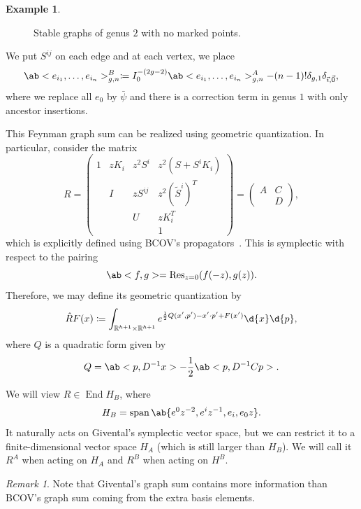 \documentclass[10pt]{amsart}
\theoremstyle{definition}
\newtheorem{exm}[thm]{Example}
\theoremstyle{remark}
\newtheorem{rmk}[thm]{Remark}
\theoremstyle{plain}
\theoremstyle{definition}
\theoremstyle{remark}
\newcommand{\R}{\mathbb{R}}
\newcommand{\on}[1]{\operatorname{#1}}
\newcommand{\1}{\mathbf{1}}
\newcommand{\2}{\mathbf{2}}
\newcommand{\3}{\mathbf{3}}
\DeclareMathOperator{\End}{End}
\begin{document}
\begin{exm}
\begin{figure}[htpb]
\begin{center}
    \end{center}
    \caption{Stable graphs of genus $2$ with no marked points.}%
    \label{fig:stable graphs of genus 2}
    \end{figure}
    We put $S^{ij}$ on each edge and at each vertex, we place
    \[ \ab<e_{i_1}, \ldots, e_{i_n}>_{g,n}^{B} \coloneqq I_0^{-(2g-2)} \ab<e_{i_1}, \ldots, e_{i_n}>_{g,n}^A - (n-1)! \delta_{g,1} \delta_{\vec{\imath}, \vec{0}}, \]
    where we replace all $e_0$ by $\bar{\psi}$ and there is a correction term in genus $1$ with only ancestor insertions. 
\end{exm}

This Feynman graph sum can be realized using geometric quantization. In particular, consider the matrix
\[ R = \begin{pmatrix}
    1 & z K_i & z^2 S^i & z^2 (S + S^i K_i) \\
    & I & z S^{ij} & z^2 (\tilde{S}^i)^T \\
    & & U & z K_i^T \\
    & & & 1
\end{pmatrix} = \begin{pmatrix}
    A & C \\
    & D
\end{pmatrix}, \]
which is explicitly defined using BCOV's propagators~\cite{bcov}. This is symplectic with respect to the pairing
\[ \ab<f,g> = \on{Res}_{z=0} (f(-z), g(z)). \]
Therefore, we may define its geometric quantization by
\[ \hat{R} F(x) \coloneqq \int_{\R^{h+1} \times \R^{h+1}} e^{\frac{1}{2} Q(x',p') - x' \cdot p' + F(x')} \d{x} \d{p}, \]
where $Q$ is a quadratic form given by
\[ Q = \ab<p,D^{-1}x> - \frac{1}{2}\ab<p, D^{-1}C p>. \]

We will view $R \in \End H_B$, where
\[ H_B = \on{span} \ab\{ e^0 z^{-2}, e^i z^{-1}, e_i, e_0 z \}. \]
It naturally acts on Givental's symplectic vector space, but we can restrict it to a finite-dimensional vector space $H_A$ (which is still larger than $H_B$). We will call it $R^A$ when acting on $H_A$ and $R^B$ when acting on $H^B$.

\begin{rmk}
    Note that Givental's graph sum contains more information than BCOV's graph sum coming from the extra basis elements.
\end{rmk}
\end{document}
